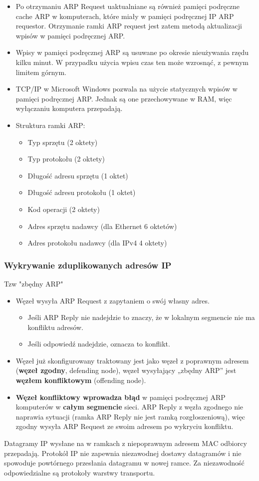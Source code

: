 \documentclass[a4paper]{article}
\begin{document}
\begin{itemize}
    \item Po otrzymaniu ARP Request uaktualniane są również pamięci podręczne cache ARP w
    komputerach, które miały w pamięci podręcznej IP ARP requestor. Otrzymanie ramki ARP request jest zatem metodą aktualizacji wpisów w
    pamięci podręcznej ARP.
    \item Wpisy w pamięci podręcznej ARP są usuwane po okresie nieużywania rzędu kilku minut. W
    przypadku użycia wpisu czas ten może wzrosnąć, z pewnym limitem górnym.
    \item TCP/IP w Microsoft Windows pozwala na użycie statycznych wpisów w pamięci podręcznej
    ARP. Jednak są one przechowywane w RAM, więc wyłączaniu komputera przepadają.
    \item Struktura ramki ARP:
    \begin{itemize}
        \item Typ sprzętu (2 oktety)
        \item Typ protokołu (2 oktety)
        \item Długość adresu sprzętu (1 oktet)
        \item Długość adresu protokołu (1 oktet)
        \item Kod operacji (2 oktety)
        \item Adres sprzętu nadawcy (dla Ethernet 6 oktetów)
        \item Adres protokołu nadawcy (dla IPv4 4 oktety)
\end{itemize}
\end{itemize}

\subsubsection{Wykrywanie zduplikowanych adresów IP}
Tzw "zbędny ARP"
\begin{itemize}
    \item Węzeł wysyła ARP Request z zapytaniem o swój własny adres.
    \begin{itemize}
        \item Jeśli ARP Reply nie nadejdzie to znaczy, że w lokalnym segmencie nie ma konfliktu adresów.
        \item Jeśli odpowiedź nadejdzie, oznacza to konflikt.
    \end{itemize}
    \item Węzeł już skonfigurowany traktowany jest jako węzeł z poprawnym adresem (\textbf{węzeł zgodny}, defending node), węzeł
    wysyłający „zbędny ARP” jest \textbf{węzłem konfliktowym} (offending node).
    \item \textbf{Węzeł konfliktowy wprowadza błąd} w pamięci podręcznej ARP komputerów w \textbf{całym segmencie} sieci. ARP Reply z węzła zgodnego nie naprawia sytuacji (ramka ARP Reply nie jest ramką rozgłoszeniową), więc zgodny wysyła ARP Request ze swoim adresem po wykryciu konfliktu.
\end{itemize}
Datagramy IP wysłane na w ramkach z niepoprawnym adresem MAC odbiorcy
przepadają. Protokół IP nie zapewnia niezawodnej dostawy datagramów i nie
spowoduje powtórnego przesłania datagramu w nowej ramce. Za niezawodność
odpowiedzialne są protokoły warstwy transportu.
\end{document}
